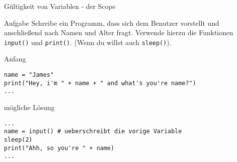 \begin{frame}[fragile]{Gültigkeit von Variablen - der Scope}
    \begin{block}{Aufgabe}
    Schreibe ein Programm, dass sich dem Benutzer vorstellt und anschließend
    nach Namen und Alter fragt. Verwende hierzu die 
    Funktionen \lstinline{input()} und \lstinline{print()}. (Wenn du willst auch
    \lstinline{sleep()}).
    \end{block}

    \begin{alertblock}{Anfang}
    \begin{lstlisting}
name = "James"
print("Hey, i'm " + name + " and what's you're name?")
...
    \end{lstlisting}
    \end{alertblock}

    \pause{}

    \begin{exampleblock}{mögliche Lösung}
    \begin{lstlisting}
...
name = input() # ueberschreibt die vorige Variable 
sleep(2)
print("Ahh, so you're " + name)
...
    \end{lstlisting}
    \end{exampleblock}
\end{frame}

